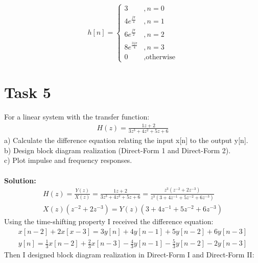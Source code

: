 \documentclass[16pt]{report}
\begin{document}
\[   
h[n] = 
     \begin{cases}
       3 & ,n = 0\\
       4e^{\frac{j\pi}{4}} &, n = 1\\
       6e^{\frac{j\pi}{2}} &, n = 2\\
       8e^{\frac{3j\pi}{4}} &, n = 3\\
       0 &, \text{otherwise}
     \end{cases}
\]
\section*{Task 5}
For a linear system with the transfer function:
\begin{gather*}
    H(z) = \frac{1z+2}{3z^{3}  + 4z^{2} + 5z+ 6}
\end{gather*}
a) Calculate the difference equation relating the input x[n] to the output y[n]. \\
b) Design block diagram realization (Direct-Form 1 and Direct-Form 2). \\
c) Plot impulse and frequency responses. \\ \\
\textbf{Solution:} \\
\begin{gather*}
    H(z) = \frac{Y(z)}{X(z)} = \frac{1z+2}{3z^{3}  + 4z^{2} + 5z+ 6} = \frac{z^{3}(z^{-2}+2z^{-3})}{z^{3}(3+4z^{-1}+5z^{-2}+6z^{-3})} \\
    X(z)(z^{-2}+2z^{-3}) = Y(z)(3+4z^{-1}+5z^{-2}+6z^{-3})
\end{gather*}
Using the time-shifting property I received the difference equation:
\begin{gather*}
    x[n-2]+2x[x-3] = 3y[n]+4y[n-1]+5y[n-2]+6y[n-3] \\
    y[n] = \frac{1}{3}x[n-2]+\frac{2}{3}x[n-3]-\frac{4}{3}y[n-1]-\frac{5}{3}y[n-2]-2y[n-3]
\end{gather*}
Then I designed block diagram realization in Direct-Form I and Direct-Form II:
\end{document}
